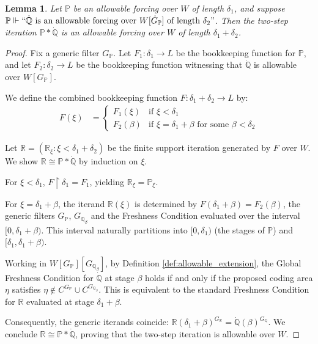 \documentclass[a4paper,11pt]{article}
\newtheorem{lemma}[theorem]{Lemma}
\newcommand{\forceP}{\mathbb{P}}
\newcommand{\forceQ}{\mathbb{Q}}
\begin{document}
\begin{lemma}\label{iteration_of_allowable}
Let $\mathbb{P}$ be an allowable forcing over $W$ of length $\delta_1$, and suppose $\mathbb{P} \Vdash ``\dot{\mathbb{Q}} \text{ is an allowable forcing over } W[\dot{G}_{\mathbb{P}}] \text{ of length } \delta_2"$. Then the two-step iteration $\mathbb{P} \ast \dot{\mathbb{Q}}$ is an allowable forcing over $W$ of length $\delta_1 + \delta_2$.
\end{lemma}

\begin{proof}
Fix a generic filter $G_{\forceP}$. Let $F_1 : \delta_1 \to L$ be the bookkeeping function for $\mathbb{P}$, and let $F_2 : \delta_2 \to L$ be the bookkeeping function witnessing that $\dot{\mathbb{Q}}$ is allowable over $W[G_{\mathbb{P}}]$. 

We define the combined bookkeeping function $F : \delta_1 + \delta_2 \to L$ by:
\begin{align*}
    F(\xi) &= 
    \begin{cases} 
        F_1(\xi) & \text{if } \xi < \delta_1 \\
        F_2(\beta) & \text{if } \xi = \delta_1 + \beta \text{ for some } \beta < \delta_2 
    \end{cases}
\end{align*}

Let $\mathbb{R} = (\mathbb{R}_{\xi} : \xi < \delta_1 + \delta_2)$ be the finite support iteration generated by $F$ over $W$. We show $\mathbb{R} \cong \mathbb{P} \ast \dot{\mathbb{Q}}$ by induction on $\xi$.

For $\xi < \delta_1$, $F \restriction \delta_1 = F_1$, yielding $\mathbb{R}_{\xi} = \mathbb{P}_{\xi}$.

For $\xi = \delta_1 + \beta$, the iterand $\mathbb{R}(\xi)$ is determined by $F(\delta_1 + \beta) = F_2(\beta)$, the generic filters $G_{\forceP}$, $G_{\forceQ_{\beta}}$ and the Freshness Condition evaluated over the interval $[0, \delta_1 + \beta)$. This interval naturally partitions into $[0, \delta_1)$ (the stages of $\mathbb{P}$) and $[\delta_1, \delta_1 + \beta)$.

Working in $W[G_{\forceP}] [G_{\forceQ_{\beta}}]$, by Definition \ref{def:allowable_extension}, the Global Freshness Condition for $\dot{\mathbb{Q}}$ at stage $\beta$ holds if and only if the proposed coding area $\eta$ satisfies $\eta \notin C^{G_{\mathbb{P}}} \cup C^{G_{\mathbb{Q}_\beta}}$. This is equivalent to the standard Freshness Condition for $\mathbb{R}$ evaluated at stage $\delta_1 + \beta$. 

Consequently, the generic iterands coincide: $\mathbb{R}(\delta_1 + \beta)^{G_{\mathbb{R}}} = \dot{\mathbb{Q}}(\beta)^{G_{\mathbb{Q}}}$. We conclude $\mathbb{R} \cong \mathbb{P} \ast \dot{\mathbb{Q}}$, proving that the two-step iteration is allowable over $W$.
\end{proof}
\end{document}

